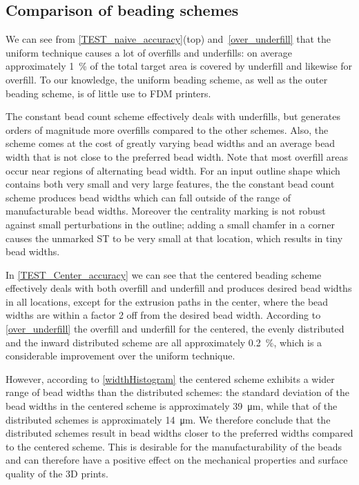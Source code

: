 

\subsection{Comparison of beading schemes}
We can see from \cref{TEST_naive_accuracy}(top) and~\ref{over_underfill} that the uniform technique causes a lot of overfills and underfills: on average approximately \SI{1}{\percent} of the total target area is covered by underfill and likewise for overfill.
To our knowledge, the uniform beading scheme, as well as the outer beading scheme, is of little use to FDM printers.

The constant bead count scheme effectively deals with underfills, but generates orders of magnitude more overfills compared to the other schemes. 
Also, the scheme comes at the cost of greatly varying bead widths and an average bead width that is not close to the preferred bead width.
Note that most overfill areas occur near regions of alternating bead width. 
For an input outline shape which contains both very small and very large features, the the constant bead count scheme produces bead widths which can fall outside of the range of manufacturable bead widths.
Moreover the centrality marking is not robust against small perturbations in the outline; adding a small chamfer in a corner causes the unmarked ST to be very small at that location, which results in tiny bead widths.

In \cref{TEST_Center_accuracy} we can see that
the centered beading scheme effectively deals with both overfill and underfill and produces desired bead widths in all locations, except for the extrusion paths in the center, where the bead widths are within a factor 2 off from the desired bead width.
According to \cref{over_underfill} the overfill and underfill for the centered, the evenly distributed and the inward distributed scheme are all approximately \SI{0.2}{\percent}, which is a considerable improvement over the uniform technique.

However, according to \cref{widthHistogram} the centered scheme exhibits a wider range of bead widths than the distributed schemes:
the standard deviation of the bead widths in the centered scheme is approximately \SI{39}{\micro\meter}, while that of the distributed schemes is approximately \SI{14}{\micro\meter}.
We therefore conclude that the distributed schemes result in bead widths closer to the preferred widths compared to the centered scheme.
This is desirable for the manufacturability of the beads and can therefore have a positive effect on the mechanical properties and surface quality of the 3D prints. 

